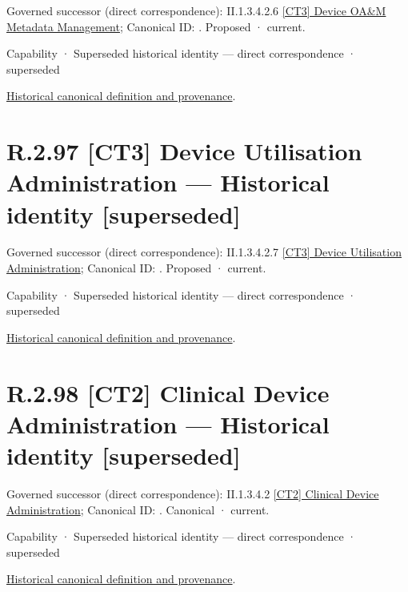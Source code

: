 {\small Governed successor (direct correspondence): II.1.3.4.2.6 \hyperref[element:659bb194a7ef42ab9ba8a938adb5c179]{[CT3] Device OA\&M Metadata Management}; Canonical ID: \texttt{}. Proposed · current.}\par
\label{element:a398c72bef094dee96c96d97994449fb}
{\small Capability · Superseded historical identity — direct correspondence · superseded}\par
\href{../../../../../../../continuum/strategy/capability/a398c72bef094dee96c96d97994449fb.md}{Historical canonical definition and provenance}.\par
\section*{R.2.97 [CT3] Device Utilisation Administration — Historical identity [superseded]}
\label{navigation:R.2.97}

{\small Governed successor (direct correspondence): II.1.3.4.2.7 \hyperref[element:1a3732b5911c45b3aece38b2db2d0f15]{[CT3] Device Utilisation Administration}; Canonical ID: \texttt{}. Proposed · current.}\par
\label{element:a0af0a86667d48f4ab95ed2920e878cb}
{\small Capability · Superseded historical identity — direct correspondence · superseded}\par
\href{../../../../../../../continuum/strategy/capability/a0af0a86667d48f4ab95ed2920e878cb.md}{Historical canonical definition and provenance}.\par
\section*{R.2.98 [CT2] Clinical Device Administration — Historical identity [superseded]}
\label{navigation:R.2.98}

{\small Governed successor (direct correspondence): II.1.3.4.2 \hyperref[element:31bcd6fda0d14cc8b992cdca39a3cbed]{[CT2] Clinical Device Administration}; Canonical ID: \texttt{}. Canonical · current.}\par
\label{element:3792be10541e4d68b3f740b1ba964966}
{\small Capability · Superseded historical identity — direct correspondence · superseded}\par
\href{../../../../../../../continuum/strategy/capability/3792be10541e4d68b3f740b1ba964966.md}{Historical canonical definition and provenance}.\par

